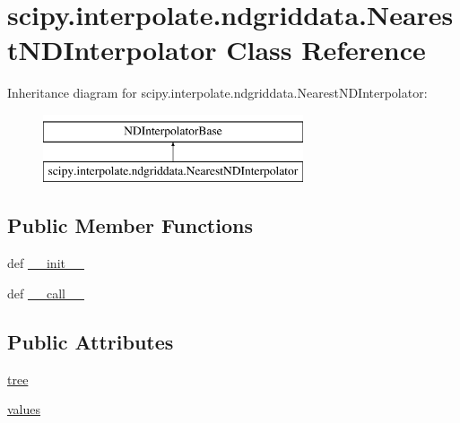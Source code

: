 \hypertarget{classscipy_1_1interpolate_1_1ndgriddata_1_1NearestNDInterpolator}{}\section{scipy.\+interpolate.\+ndgriddata.\+Nearest\+N\+D\+Interpolator Class Reference}
\label{classscipy_1_1interpolate_1_1ndgriddata_1_1NearestNDInterpolator}
Inheritance diagram for scipy.\+interpolate.\+ndgriddata.\+Nearest\+N\+D\+Interpolator\+:\begin{figure}[H]
\begin{center}
\leavevmode
\includegraphics[height=2.000000cm]{classscipy_1_1interpolate_1_1ndgriddata_1_1NearestNDInterpolator}
\end{center}
\end{figure}
\subsection*{Public Member Functions}
\begin{DoxyCompactItemize}
\item 
def \hyperlink{classscipy_1_1interpolate_1_1ndgriddata_1_1NearestNDInterpolator_af880eac49f4bb6bf97b76fc0ae7f6a92}{\+\_\+\+\_\+init\+\_\+\+\_\+}
\item 
def \hyperlink{classscipy_1_1interpolate_1_1ndgriddata_1_1NearestNDInterpolator_a52d809279d234cbffac25d3cd2cf99ce}{\+\_\+\+\_\+call\+\_\+\+\_\+}
\end{DoxyCompactItemize}
\subsection*{Public Attributes}
\begin{DoxyCompactItemize}
\item 
\hyperlink{classscipy_1_1interpolate_1_1ndgriddata_1_1NearestNDInterpolator_ac104d3fb6230905a31b6a4fb5438231f}{tree}
\item 
\hyperlink{classscipy_1_1interpolate_1_1ndgriddata_1_1NearestNDInterpolator_ad15b2dd987145ee7067ec79dd48ae8af}{values}
\end{DoxyCompactItemize}


